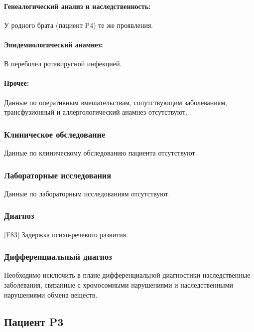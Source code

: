 \documentclass[a4paper,14pt]{extarticle}
\newcommand{\months}{мес.}
\newcommand{\DS}[2]{[#2] #1}
\begin{document}
\paragraph{Генеалогический анализ и наследственность:} У родного брата (пациент P4) те же проявления.

\paragraph{Эпидемиологический анамнез:} В \numprint[\months]{5} переболел ротавирусной инфекцией.

\paragraph{Прочее:} Данные по оперативным вмешательствам, сопутствующим заболеваниям, трансфузионный и аллергологический анамнез отсутствуют.

\subsubsection*{Клиническое обследование}

Данные по клиническому обследованию пациента отсутствуют.

\subsubsection*{Лабораторные исследования}

Данные по лабораторным исследованиям отсутствуют.

\subsubsection*{Диагноз}

\DS{Задержка психо-речевого развития}{F83}.

\subsubsection*{Дифференциальный диагноз}

Необходимо исключить в плане дифференциальной диагностики наследственные заболевания, связанные с хромосомными нарушениями и наследственными нарушениями обмена  веществ.

\newpage
\subsection*{Пациент P3}
\end{document}
